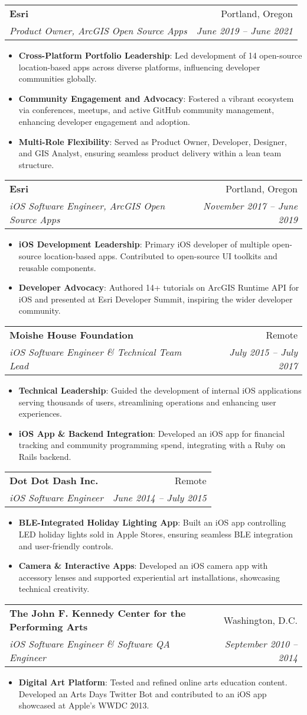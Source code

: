 \documentclass[letterpaper,11pt]{article}
\makeatletter
\newcommand{\resumeItem}[2]{
  \item\small{
    \textbf{#1}: #2 \vspace{-2pt}
  }
}
\newcommand{\resumeSubheading}[4]{
  \vspace{-1pt}\item
    \begin{tabular*}{0.97\textwidth}[t]{l@{\extracolsep{\fill}}r}
      \textbf{#1} & #2 \\
      \textit{\small #3} & \textit{\small #4} \\
    \end{tabular*}\vspace{-5pt}
}
\newcommand{\resumeItemListStart}{\begin{itemize}}
\newcommand{\resumeItemListEnd}{\end{itemize}\vspace{-5pt}}
\makeatother
\begin{document}
  \resumeSubheading
    {Esri}{Portland, Oregon}
    {Product Owner, ArcGIS Open Source Apps}{June 2019 -- June 2021}
    \resumeItemListStart
      \resumeItem{Cross-Platform Portfolio Leadership}
        {Led development of 14 open-source location-based apps across diverse platforms, influencing developer communities globally.}
      \resumeItem{Community Engagement and Advocacy}
        {Fostered a vibrant ecosystem via conferences, meetups, and active GitHub community management, enhancing developer engagement and adoption.}
      \resumeItem{Multi-Role Flexibility}
        {Served as Product Owner, Developer, Designer, and GIS Analyst, ensuring seamless product delivery within a lean team structure.}
    \resumeItemListEnd

  \resumeSubheading
    {Esri}{Portland, Oregon}
    {iOS Software Engineer, ArcGIS Open Source Apps}{November 2017 -- June 2019}
    \resumeItemListStart
      \resumeItem{iOS Development Leadership}
        {Primary iOS developer of multiple open-source location-based apps. Contributed to open-source UI toolkits and reusable components.}
      \resumeItem{Developer Advocacy}
        {Authored 14+ tutorials on ArcGIS Runtime API for iOS and presented at Esri Developer Summit, inspiring the wider developer community.}
    \resumeItemListEnd

  \resumeSubheading
    {Moishe House Foundation}{Remote}
    {iOS Software Engineer \& Technical Team Lead}{July 2015 -- July 2017}
    \resumeItemListStart
      \resumeItem{Technical Leadership}
        {Guided the development of internal iOS applications serving thousands of users, streamlining operations and enhancing user experiences.}
      \resumeItem{iOS App \& Backend Integration}
        {Developed an iOS app for financial tracking and community programming spend, integrating with a Ruby on Rails backend.}
    \resumeItemListEnd

  \resumeSubheading
    {Dot Dot Dash Inc.}{Remote}
    {iOS Software Engineer}{June 2014 -- July 2015}
    \resumeItemListStart
      \resumeItem{BLE-Integrated Holiday Lighting App}
        {Built an iOS app controlling LED holiday lights sold in Apple Stores, ensuring seamless BLE integration and user-friendly controls.}
      \resumeItem{Camera \& Interactive Apps}
        {Developed an iOS camera app with accessory lenses and supported experiential art installations, showcasing technical creativity.}
    \resumeItemListEnd

  \resumeSubheading
    {The John F. Kennedy Center for the Performing Arts}{Washington, D.C.}
    {iOS Software Engineer \& Software QA Engineer}{September 2010 -- 2014}
    \resumeItemListStart
      \resumeItem{Digital Art Platform}
        {Tested and refined online arts education content. Developed an Arts Days Twitter Bot and contributed to an iOS app showcased at Apple’s WWDC 2013.}
    \resumeItemListEnd
\end{document}
